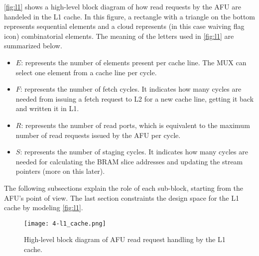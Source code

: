 \autoref{fig:l1} shows a high-level block diagram of how read requests by the AFU are handeled in the L1 cache. In this figure, a rectangle with a triangle on the bottom represents sequential elements and a cloud represents (in this case waiving flag icon) combinatorial elements. The meaning of the letters used in \autoref{fig:l1} are summarized below.
\begin{itemize}
	\item $E$: represents the number of elements present per cache line. The MUX can select one element from a cache line per cycle.
	\item $F$: represents the number of fetch cycles. It indicates how many cycles are needed from issuing a fetch request to L2 for a new cache line, getting it back and written it in L1.
	\item $R$: represents the number of read ports, which is equivalent to the maximum number of read requests issued by the AFU per cycle.
	\item $S$: represents the number of staging cycles. It indicates how many cycles are needed for calculating the BRAM slice addresses and updating the stream pointers (more on this later).
\end{itemize}
The following subsections explain the role of each sub-block, starting from the AFU's point of view. The last section constraints the design space for the L1 cache by modeling \autoref{fig:l1}.

\begin{figure}[H]
	\centering
	\texttt{[image: 4-l1\_cache.png]}
	\caption{High-level block diagram of AFU read request handling by the L1 cache.}
	\label{fig:l1}
\end{figure}


